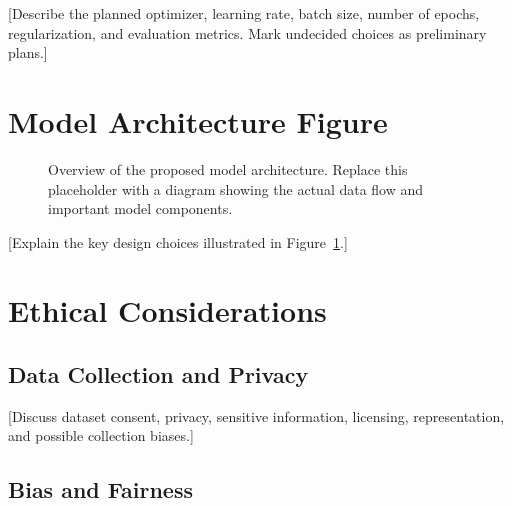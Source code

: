 \documentclass{article}
\begin{document}
[Describe the planned optimizer, learning rate, batch size, number of
epochs, regularization, and evaluation metrics. Mark undecided choices
as preliminary plans.]

\section{Model Architecture Figure}


\begin{figure}[H]
    \centering


    \caption{Overview of the proposed model architecture.
    Replace this placeholder with a diagram showing the actual
    data flow and important model components.}
    \label{fig:architecture}
\end{figure}

[Explain the key design choices illustrated in Figure~\ref{fig:architecture}.]

\section{Ethical Considerations}

\subsection{Data Collection and Privacy}

[Discuss dataset consent, privacy, sensitive information, licensing,
representation, and possible collection biases.]

\subsection{Bias and Fairness}
\end{document}
